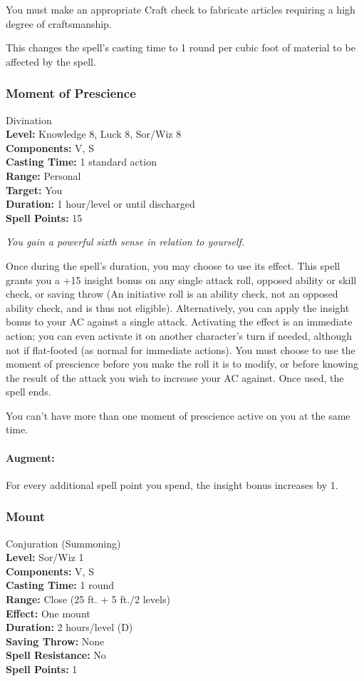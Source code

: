You must make an appropriate Craft check to fabricate articles requiring a high degree of craftsmanship.

This changes the spell's casting time to 1 round per cubic foot of material to be affected by the spell.
\subsubsection{Moment of Prescience}
\label{Spell:MomentOfPrescience}
Divination
\\ \textbf{Level:} Knowledge 8, Luck 8, Sor/Wiz 8
\\ \textbf{Components:} V, S
\\ \textbf{Casting Time:} 1 standard action
\\ \textbf{Range:} Personal
\\ \textbf{Target:} You
\\ \textbf{Duration:} 1 hour/level or until discharged
\\ \textbf{Spell Points:} 15

\emph{You gain a powerful sixth sense in relation to yourself.}

Once during the spell's duration, you may choose to use its effect. 
This spell grants you a +15 insight bonus on any single attack roll, 
opposed ability or skill check, or saving throw
(An initiative roll is an ability check, not an opposed ability check, and is thus not eligible).
Alternatively, you can apply the insight bonus to your AC against a single attack. 
Activating the effect is an immediate action; you can even activate it on another character's turn if needed, 
although not if flat-footed (as normal for immediate actions). 
You must choose to use the moment of prescience before you make the roll it is to modify, 
or before knowing the result of the attack you wish to increase your AC against. 
Once used, the spell ends.

You can't have more than one moment of prescience active on you at the same time. 

\paragraph{Augment:} For every additional spell point you spend, the insight bonus increases by 1.
\subsubsection{Mount}
\label{Spell:Mount}
Conjuration (Summoning)
\\ \textbf{Level:} Sor/Wiz 1
\\ \textbf{Components:} V, S
\\ \textbf{Casting Time:} 1 round
\\ \textbf{Range:} Close (25 ft. + 5 ft./2 levels)
\\ \textbf{Effect:} One mount
\\ \textbf{Duration:} 2 hours/level (D)
\\ \textbf{Saving Throw:} None
\\ \textbf{Spell Resistance:} No
\\ \textbf{Spell Points:} 1

